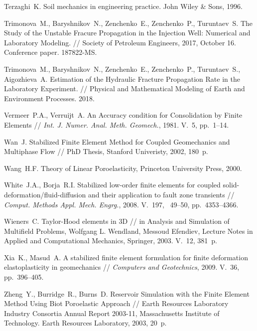 \begin{thebibliography}{1000}
Terzaghi~K. Soil mechanics in engineering practice. John Wiley \& Sons, 1996.

Trimonova~M., Baryshnikov~N., Zenchenko~E., Zenchenko~P., Turuntaev~S.
The Study of the Unstable Fracure Propagation in the Injection Well: Numerical and Laboratory Modeling. // 
Society of Petroleum Engineers, 2017, October 16. 
Conference paper. 187822-MS. 

Trimonova~M., Baryshnikov~N., Zenchenko~E., Zenchenko~P., Turuntaev~S., Aigozhieva~A.
Estimation of the Hydraulic Fracture Propagation Rate in the Laboratory Experiment. // 
Physical and Mathematical Modeling of Earth and Environment Processes. 2018.

Vermeer~P.A., Verruijt~A.
An Accuracy condition for Consolidation by Finite Elements //
\emph{Int. J. Numer. Anal. Meth. Geomech.}, 1981. V.~5, pp.~1--14.

Wan~J. Stabilized Finite Element Method for Coupled Geomechanics and  Multiphase Flow //
PhD Thesis, Stanford Univeristy, 2002, 180~p.

Wang~H.F. Theory of Linear Poroelasticity, Princeton University Press, 2000.

White~J.A., Borja~R.I. 
Stabilized low-order finite elements for coupled solid-deformation/fluid-diffusion and their application to fault zone transients //
\emph{Comput. Methods Appl. Mech. Engrg.}, 2008.
V.~197, \No~49--50, pp.~4353--4366.

Wieners~C.
Taylor-Hood elements in 3D // in Analysis and Simulation of Multifield Problems, 
Wolfgang L. Wendland, Messoud Efendiev, Lecture Notes in Applied and Computational Mechanics, Springer, 2003.
V.~12, 381~p.

Xia~K., Masud~A.
A stabilized finite element formulation for finite deformation
elastoplasticity in geomechanics // \emph{Computers and Geotechnics}, 2009.
V.~36, pp.~396--405.

Zheng~Y., Burridge~R., Burns~D.
Reservoir Simulation with the Finite Element Method Using Biot Poroelastic Approach // 
Earth Resources Laboratory Industry Consortia Annual Report 2003-11, 
Massachusetts Institute of Technology. Earth Resources Laboratory, 2003, 20~p.

\end{thebibliography}

\endinput

